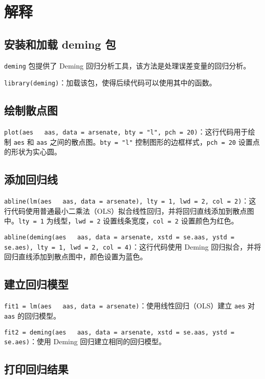 \documentclass[UTF8]{report}
\theoremstyle{MyLineTheoremStyle} %
\theoremstyle{MyBlockTheoremStyle} %
\theoremstyle{MySubsubsectionStyle} %
\begin{document}
\section*{解释}

\subsection*{安装和加载 deming 包}

\texttt{deming} 包提供了 Deming 回归分析工具，该方法是处理误差变量的回归分析。

\texttt{library(deming)}：加载该包，使得后续代码可以使用其中的函数。

\subsection*{绘制散点图}

\texttt{plot(aes ~ aas, data = arsenate, bty = "l", pch = 20)}：这行代码用于绘制 \texttt{aes} 和 \texttt{aas} 之间的散点图。\texttt{bty = "l"} 控制图形的边框样式，\texttt{pch = 20} 设置点的形状为实心圆。

\subsection*{添加回归线}

\texttt{abline(lm(aes ~ aas, data = arsenate), lty = 1, lwd = 2, col = 2)}：这行代码使用普通最小二乘法（OLS）拟合线性回归，并将回归直线添加到散点图中。\texttt{lty = 1} 为线型，\texttt{lwd = 2} 设置线条宽度，\texttt{col = 2} 设置颜色为红色。

\texttt{abline(deming(aes ~ aas, data = arsenate, xstd = se.aas, ystd = se.aes), lty = 1, lwd = 2, col = 4)}：这行代码使用 Deming 回归拟合，并将回归直线添加到散点图中，颜色设置为蓝色。

\subsection*{建立回归模型}

\texttt{fit1 = lm(aes ~ aas, data = arsenate)}：使用线性回归（OLS）建立 \texttt{aes} 对 \texttt{aas} 的回归模型。

\texttt{fit2 = deming(aes ~ aas, data = arsenate, xstd = se.aas, ystd = se.aes)}：使用 Deming 回归建立相同的回归模型。

\subsection*{打印回归结果}
\end{document}
